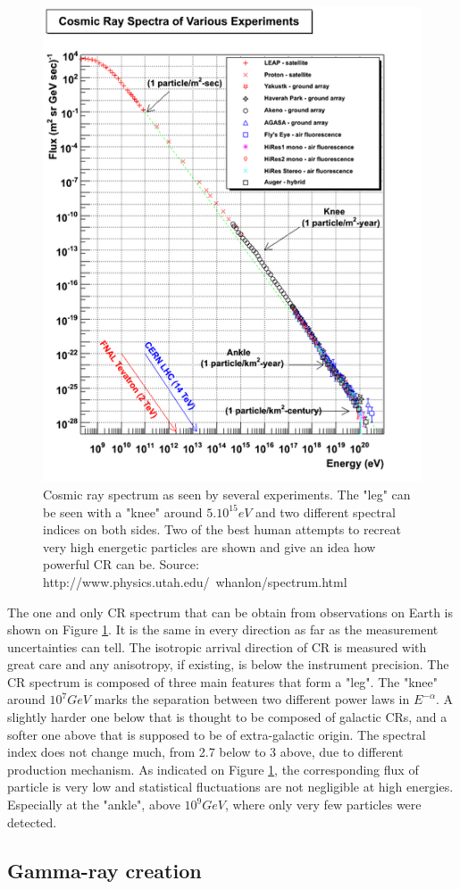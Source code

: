 \begin{figure}[h]
 \centering
 \includegraphics[width=.5\linewidth]{pic/theory/CR_spectrum.png}
 \caption{Cosmic ray spectrum as seen by several experiments. The "leg" can be seen with a "knee" around $5.10^{15} eV$ and two different spectral indices on both sides. Two of the best human attempts to recreat very high energetic particles are shown and give an idea how powerful CR can be.
 Source: http://www.physics.utah.edu/~whanlon/spectrum.html}
 \label{fig:CR_spectrum}
\end{figure}

The one and only CR spectrum that can be obtain from observations on Earth is shown on Figure \ref{fig:CR_spectrum}. It is the same in every direction as far as the measurement uncertainties can tell. The isotropic arrival direction of CR is measured with great care and any anisotropy, if existing, is below the instrument precision.
The CR spectrum is composed of three main features that form a "leg". The "knee" around $10^{7} GeV$ marks the separation between two different power laws in $E^{-\alpha}$. A slightly harder one below that is thought to be composed of galactic CRs, and a softer one above that is supposed to be of extra-galactic origin. The spectral index does not change much, from 2.7 below to 3 above, due to different production mechanism.
As indicated on Figure \ref{fig:CR_spectrum}, the corresponding flux of particle is very low and statistical fluctuations are not negligible at high energies. Especially at the "ankle", above $10^9 GeV$, where only very few particles were detected.


\subsection{Gamma-ray creation}

